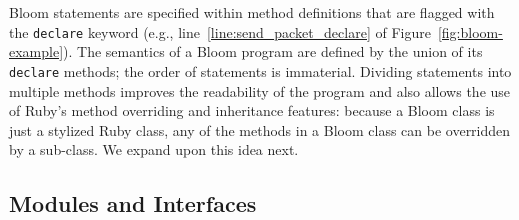 Bloom statements are specified within method definitions that are flagged with
the \texttt{declare} keyword (e.g., line~\ref{line:send_packet_declare} of
Figure~\ref{fig:bloom-example}). The semantics of a Bloom program are defined by
the union of its \texttt{declare} methods; the order of statements is
immaterial. Dividing statements into multiple methods improves the readability
of the program and also allows the use of Ruby's method overriding and
inheritance features: because a Bloom class is just a stylized Ruby class, any
of the methods in a Bloom class can be overridden by a sub-class.  We expand upon this idea next.


\begin{comment}
The constructs above form the core of the Bloom language.
Bud also includes some additional convenience methods that provide macros over
these methods and allows the use of simple side-effect-free Ruby expressions
within statements.
\end{comment}

\subsection{Modules and Interfaces}
\label{sec:modularity}
\begin{comment}
\jmh{More is needed here.  First, you need to introduce the use of interfaces: inputs on rhs of rules, outputs on lhs.  Two modules compose if they reference each other's interface collections in this pattern.  Note that this is local and synchronous composition at the interfaces, though a given module may itself have asynchronous or distributed behaviors inside.  Second, you need to talk about how we use Ruby's inheritance and mixin features.  This probably deserves a subsection on Modularity and Inheritance or something.}
\end{comment}

